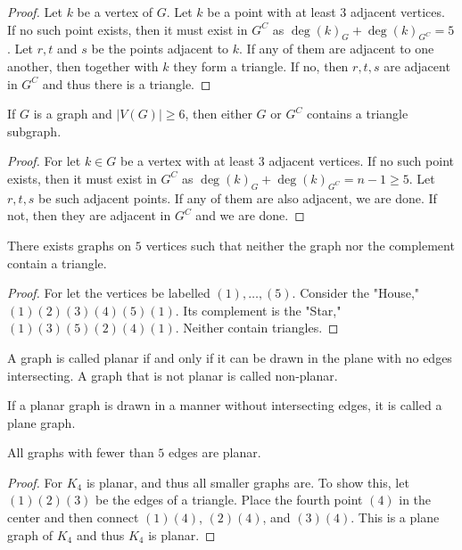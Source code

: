     \begin{proof}
    Let $k$ be a vertex of $G$. Let $k$ be a point with at least $3$ adjacent vertices. If no such point exists, then it must exist in $G^C$ as $\deg(k)_G+\deg(k)_{G^C}=5$. Let $r,t$ and $s$ be the points adjacent to $k$. If any of them are adjacent to one another, then together with $k$ they form a triangle. If no, then $r,t,s$ are adjacent in $G^C$ and thus there is a triangle.
    \end{proof}
    \begin{theorem}
    If $G$ is a graph and $|V(G)|\geq 6$, then either $G$ or $G^C$ contains a triangle subgraph.
    \end{theorem}
    \begin{proof}
    For let $k\in G$ be a vertex with at least $3$ adjacent vertices. If no such point exists, then it must exist in $G^C$ as $\deg(k)_G+\deg(k)_{G^C} = n-1 \geq 5$. Let $r,t,s$ be such adjacent points. If any of them are also adjacent, we are done. If not, then they are adjacent in $G^C$ and we are done.
    \end{proof}
    \begin{theorem}
    There exists graphs on $5$ vertices such that neither the graph nor the complement contain a triangle.
    \end{theorem}
    \begin{proof}
    For let the vertices be labelled $(1),\hdots,(5)$. Consider the "House," $(1)(2)(3)(4)(5)(1)$. Its complement is the "Star," $(1)(3)(5)(2)(4)(1)$. Neither contain triangles.
    \end{proof}
    \begin{definition}
    A graph is called planar if and only if it can be drawn in the plane with no edges intersecting. A graph that is not planar is called non-planar.
    \end{definition}
    \begin{definition}
    If a planar graph is drawn in a manner without intersecting edges, it is called a plane graph.
    \end{definition}
    \begin{theorem}
    All graphs with fewer than $5$ edges are planar.
    \end{theorem}
    \begin{proof}
    For $K_4$ is planar, and thus all smaller graphs are. To show this, let $(1)(2)(3)$ be the edges of a triangle. Place the fourth point $(4)$ in the center and then connect $(1)(4)$, $(2)(4)$, and $(3)(4)$. This is a plane graph of $K_4$ and thus $K_4$ is planar.
    \end{proof}
